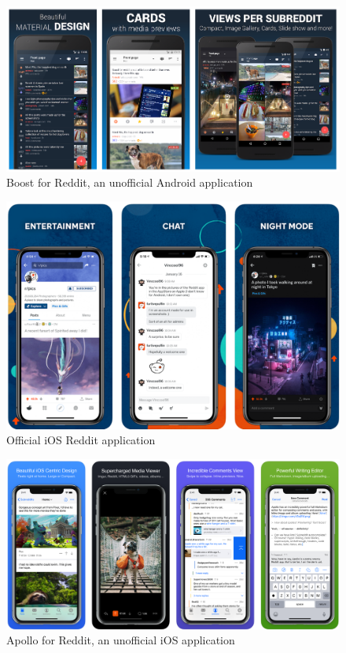     \begin{figure}[ht]
        \centering
             \includegraphics[width=\textwidth]{figures/reddit/reddit_boost.png}
        \caption{Boost for Reddit, an unofficial Android application}
        \label{a:fig:reddit_boost}
    \end{figure}
    
    \begin{figure}[ht]
        \centering
             \includegraphics[width=\textwidth]{figures/reddit/reddit_ios.png}
        \caption{Official iOS Reddit application}
        \label{a:fig:reddit_ios}
    \end{figure}
    
    \begin{figure}[ht]
        \centering
             \includegraphics[width=\textwidth]{figures/reddit/reddit_apollo.png}
        \caption{Apollo for Reddit, an unofficial iOS application}
        \label{a:fig:reddit_apollo}
    \end{figure}
    
